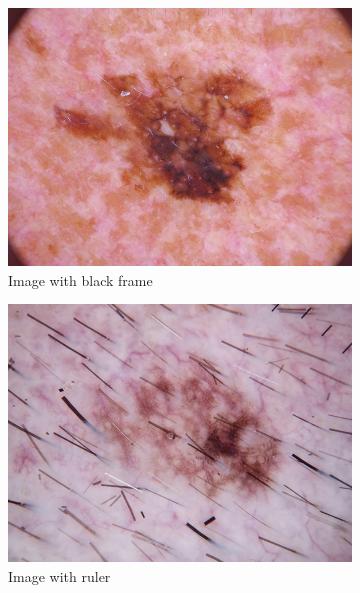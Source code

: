 \begin{figure}[ht]
    \begin{center}
        \begin{subfigure}[b]{0.3\textwidth}
            \includegraphics[width=\textwidth]{./images/ISIC_0024310.jpg}
            \caption{Image with black frame}
        \end{subfigure}
        \begin{subfigure}[b]{0.3\textwidth}
            \includegraphics[width=\textwidth]{./images/ISIC_0024420.jpg}
            \caption{Image with ruler}
        \end{subfigure}
        \begin{subfigure}[b]{0.3\textwidth}

\end{subfigure}
\end{center}
\end{figure}
